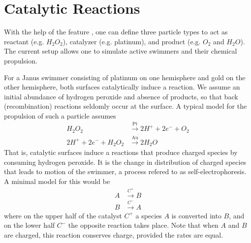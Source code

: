 \section{Catalytic Reactions}
\label{sec:Reactions}

With the help of the feature , one can define three particle types to act as reactant (e.g. $H_{2}O_{2}$), catalyzer (e.g. platinum), and product (e.g. $O_{2}$ and $H_{2}O$). The current setup allows one to simulate active swimmers and their chemical propulsion.

For a Janus swimmer consisting of platinum on one hemisphere and gold on the other hemisphere, both surfaces catalytically induce a reaction. We assume an initial abundance of hydrogen peroxide and absence of products, so that back (recombination) reactions seldomly occur at the surface. A typical model for the propulsion of such a particle assumes
\begin{align}
  \label{eq:H2O2}
    H_{2}O_{2} &\xrightarrow{\text{Pt}} 2 H^{+} + 2 e^{-} + O_{2} \\
    2 H^{+} + 2 e^{-} + H_{2}O_{2} &\xrightarrow{\text{Au}} 2 H_{2}O
\end{align}
That is, catalytic surfaces induce a reactions that produce charged species by consuming hydrogen peroxide. It is the change in distribution of charged species that leads to motion of the swimmer, a process refered to as self-electrophoresis. A minimal model for this would be
\begin{align}
  \label{eq:simple}
    A &\xrightarrow{C^{+}} B \\
    B &\xrightarrow{C^{-}} A
\end{align}
where on the upper half of the catalyst $C^{+}$ a species $A$ is converted into $B$, and on the lower half $C^{-}$ the opposite reaction takes place. Note that when $A$ and $B$ are charged, this reaction conserves charge, provided the rates are equal.

